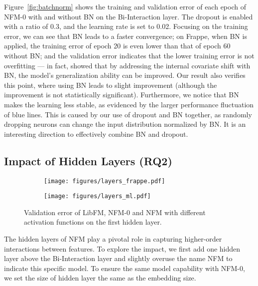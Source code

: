Figure~\ref{fig:batchnorm} shows the training and validation error of each epoch of NFM-0 with and without BN on the Bi-Interaction layer. The dropout is enabled with a ratio of 0.3, and the learning rate is set to 0.02. Focusing on the training error, we can see that BN leads to a faster convergence; on Frappe, when BN is applied, the training error of epoch 20 is even lower than that of epoch 60 without BN; and the validation error indicates that the lower training error is not overfitting --- in fact, \cite{cvpr16best,ioffe2015batch} showed that by addressing the internal covariate shift with BN, the model's generalization ability can be improved. Our result also verifies this point, where using BN leads to slight improvement (although the improvement is not statistically significant). 
Furthermore, we notice that BN makes the learning less stable, as evidenced by the larger performance fluctuation of blue lines. 
This is caused by our use of dropout and BN together, as randomly dropping neurons can change the input distribution normalized by BN. It is an interesting direction to effectively combine BN and dropout. 


\subsection{Impact of Hidden Layers (RQ2)}

\begin{figure}[t]
	\centering
	\begin{subfigure}[b]{0.24\textwidth}
		\centering
		\texttt{[image: figures/layers\_frappe.pdf]}
		\vspace{-20pt}
\label{fig:layers_frappe}
	\end{subfigure} \hspace{-7pt}
	\begin{subfigure}[b]{0.24\textwidth}
		\centering
		\texttt{[image: figures/layers\_ml.pdf]}
		\vspace{-20pt}
\label{fig:layers_ml}
	\end{subfigure} \hspace{-7pt}
	\caption{Validation error of LibFM, NFM-0 and NFM with different activation functions on the first hidden layer.}
	\vspace{-10pt}
	\label{fig:layers}
\end{figure}


The hidden layers of NFM play a pivotal role in capturing higher-order interactions between features. 
To explore the impact, we first add one hidden layer above the Bi-Interaction layer and slightly overuse the name NFM to indicate this specific model. 
To ensure the same model capability with NFM-0, we set the size of hidden layer the same as the embedding size.

